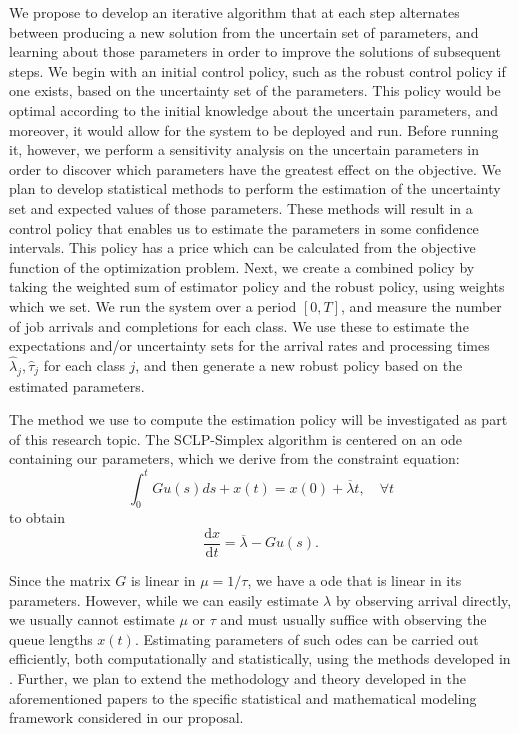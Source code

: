 \documentclass[11pt,a4paper,titlepage]{article}
\theoremstyle{definition}
\theoremstyle{plain}
\begin{document}
    We propose to develop an iterative algorithm that at each step
    alternates between producing a new solution from the uncertain set of parameters,
    and learning about those parameters in order to improve the solutions of subsequent steps.
    We begin with
    an initial control policy,
    such as the robust control policy if one exists,
    based on the uncertainty set of the parameters.
    This policy would be optimal according to the initial knowledge about the uncertain parameters,
    and moreover,
    it would allow for the system to be deployed and run.
    Before running it,
    however,
    we perform a sensitivity analysis on the uncertain parameters in order to discover which parameters have the greatest effect on the objective.
    We plan to develop statistical methods to perform the estimation of the uncertainty set and expected values of those parameters.
    These methods will result in a control policy that enables us to estimate the parameters in some confidence intervals.
    This policy has a price which can be calculated from the objective function of the optimization problem.
    Next,
    we create a combined policy by taking the weighted sum of estimator policy and the robust policy,
    using weights which we set.
    We run the system over a period $[0,T]$,
    and measure the number of job arrivals and completions for each class.
    We use these to estimate the expectations and/or uncertainty sets for the arrival rates and processing times $\hat{\lambda}_j, \hat{\tau}_j$ for each class $j$,
    and then generate a new robust policy based on the estimated parameters.


    The method we use to compute the estimation policy will be investigated as part of this research topic.
    The SCLP-Simplex algorithm is centered on an \gls{ode} containing our parameters,
    which we derive from the constraint equation:
    $$
    \int_{0}^{t} G {u}(s) d s+{x}(t)={x}(0)+\overline{{\lambda}} t, \quad \forall t
    $$
    to obtain
    $$
    \frac{\mathrm{d}x}{\mathrm{d}t} = \overline{{\lambda}} - G {u}(s) \text{.}
    $$

    Since the matrix $G$ is linear in $\mu=1/\tau$,
    we have a \gls{ode} that is linear in its parameters.
    However,
    while we can easily estimate $\lambda$ by observing arrival directly,
    we usually cannot estimate $\mu$ or $\tau$ and must usually suffice with observing the queue lengths $x(t)$.
    Estimating parameters of such \glspl{ode} can be carried out efficiently,
    both computationally and statistically,
    using the methods developed in
    \autocite{dattner2020separable,dattner2015optimal,dattner2015model,Yaari2019,dattner2018application,vujavcic2018consistency}.
    Further,
    we plan to extend the methodology and theory developed in the aforementioned papers to the specific statistical and mathematical modeling framework considered in our proposal.
\end{document}
